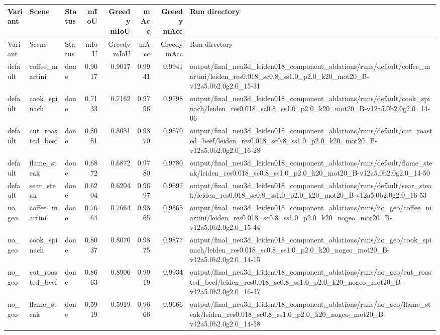 \documentclass[10pt]{article}
\begin{document}
\small
\begin{longtable}{lllrrrrp{9cm}}
\toprule
Variant & Scene & Status & mIoU & Greedy mIoU & mAcc & Greedy mAcc & Run directory \\
\midrule
\endfirsthead
\toprule
Variant & Scene & Status & mIoU & Greedy mIoU & mAcc & Greedy mAcc & Run directory \\
\midrule
\endhead
default & coffee\_martini & done & 0.9017 & 0.9017 & 0.9941 & 0.9941 & output/final\_neu3d\_leiden018\_component\_ablations/runs/default/coffee\_martini/leiden\_res0.018\_sc0.8\_ss1.0\_p2.0\_k20\_mot20\_B-v12a5.0b2.0g2.0\_15-31 \\
default & cook\_spinach & done & 0.7133 & 0.7162 & 0.9796 & 0.9798 & output/final\_neu3d\_leiden018\_component\_ablations/runs/default/cook\_spinach/leiden\_res0.018\_sc0.8\_ss1.0\_p2.0\_k20\_mot20\_B-v12a5.0b2.0g2.0\_14-06 \\
default & cut\_roasted\_beef & done & 0.8081 & 0.8081 & 0.9870 & 0.9870 & output/final\_neu3d\_leiden018\_component\_ablations/runs/default/cut\_roasted\_beef/leiden\_res0.018\_sc0.8\_ss1.0\_p2.0\_k20\_mot20\_B-v12a5.0b2.0g2.0\_16-28 \\
default & flame\_steak & done & 0.6872 & 0.6872 & 0.9780 & 0.9780 & output/final\_neu3d\_leiden018\_component\_ablations/runs/default/flame\_steak/leiden\_res0.018\_sc0.8\_ss1.0\_p2.0\_k20\_mot20\_B-v12a5.0b2.0g2.0\_14-50 \\
default & sear\_steak & done & 0.6204 & 0.6204 & 0.9697 & 0.9697 & output/final\_neu3d\_leiden018\_component\_ablations/runs/default/sear\_steak/leiden\_res0.018\_sc0.8\_ss1.0\_p2.0\_k20\_mot20\_B-v12a5.0b2.0g2.0\_16-53 \\
no\_geo & coffee\_martini & done & 0.7664 & 0.7664 & 0.9865 & 0.9865 & output/final\_neu3d\_leiden018\_component\_ablations/runs/no\_geo/coffee\_martini/leiden\_res0.018\_sc0.8\_ss1.0\_p2.0\_k20\_nogeo\_mot20\_B-v12a5.0b2.0g2.0\_15-44 \\
no\_geo & cook\_spinach & done & 0.8037 & 0.8070 & 0.9875 & 0.9877 & output/final\_neu3d\_leiden018\_component\_ablations/runs/no\_geo/cook\_spinach/leiden\_res0.018\_sc0.8\_ss1.0\_p2.0\_k20\_nogeo\_mot20\_B-v12a5.0b2.0g2.0\_14-15 \\
no\_geo & cut\_roasted\_beef & done & 0.8663 & 0.8906 & 0.9919 & 0.9934 & output/final\_neu3d\_leiden018\_component\_ablations/runs/no\_geo/cut\_roasted\_beef/leiden\_res0.018\_sc0.8\_ss1.0\_p2.0\_k20\_nogeo\_mot20\_B-v12a5.0b2.0g2.0\_16-37 \\
no\_geo & flame\_steak & done & 0.5919 & 0.5919 & 0.9666 & 0.9666 & output/final\_neu3d\_leiden018\_component\_ablations/runs/no\_geo/flame\_steak/leiden\_res0.018\_sc0.8\_ss1.0\_p2.0\_k20\_nogeo\_mot20\_B-v12a5.0b2.0g2.0\_14-58 \\

\end{longtable}
\end{document}
